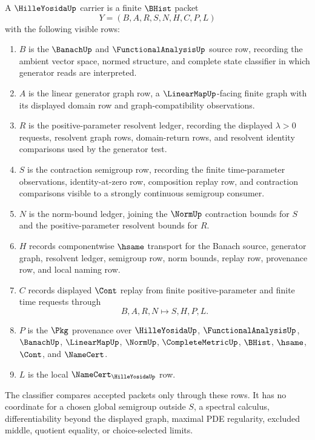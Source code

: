\begin{definition}
\label{def:hille-yosida-carrier}
A $\HilleYosidaUp$ carrier is a finite $\BHist$ packet
$$
Y=(B,A,R,S,N,H,C,P,L)
$$
with the following visible rows:
\begin{enumerate}
\item $B$ is the $\BanachUp$ and $\FunctionalAnalysisUp$ source row, recording the ambient vector space, normed structure, and complete state classifier in which generator reads are interpreted.
\item $A$ is the linear generator graph row, a $\LinearMapUp$-facing finite graph with its displayed domain row and graph-compatibility observations.
\item $R$ is the positive-parameter resolvent ledger, recording the displayed $\lambda>0$ requests, resolvent graph rows, domain-return rows, and resolvent identity comparisons used by the generator test.
\item $S$ is the contraction semigroup row, recording the finite time-parameter observations, identity-at-zero row, composition replay row, and contraction comparisons visible to a strongly continuous semigroup consumer.
\item $N$ is the norm-bound ledger, joining the $\NormUp$ contraction bounds for $S$ and the positive-parameter resolvent bounds for $R$.
\item $H$ records componentwise $\hsame$ transport for the Banach source, generator graph, resolvent ledger, semigroup row, norm bounds, replay row, provenance row, and local naming row.
\item $C$ records displayed $\Cont$ replay from finite positive-parameter and finite time requests through
$$
B,A,R,N \longmapsto S,H,P,L .
$$
\item $P$ is the $\Pkg$ provenance over $\HilleYosidaUp$, $\FunctionalAnalysisUp$, $\BanachUp$, $\LinearMapUp$, $\NormUp$, $\CompleteMetricUp$, $\BHist$, $\hsame$, $\Cont$, and $\NameCert$.
\item $L$ is the local $\NameCert_{\HilleYosidaUp}$ row.
\end{enumerate}
The classifier compares accepted packets only through these rows. It has no coordinate for a chosen global semigroup outside $S$, a spectral calculus, differentiability beyond the displayed graph, maximal PDE regularity, excluded middle, quotient equality, or choice-selected limits.
\end{definition}

